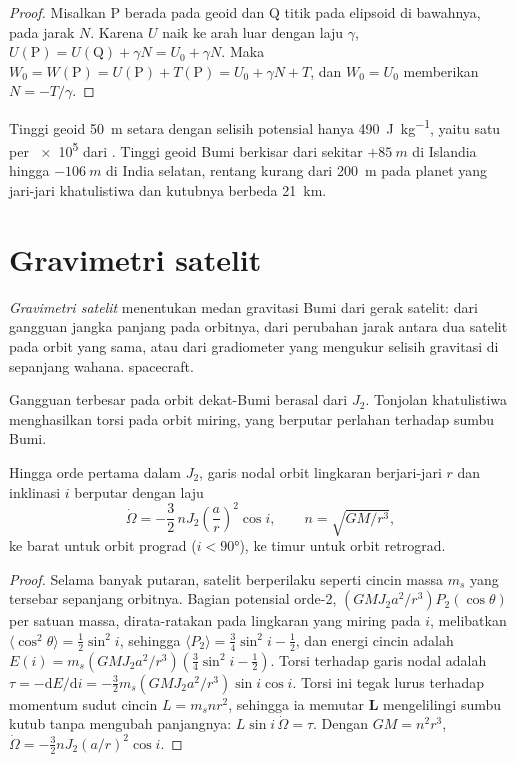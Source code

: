 \begin{proof}
Misalkan P berada pada geoid dan Q titik pada elipsoid di bawahnya, pada jarak
$N$. Karena $U$ naik ke arah luar dengan laju $\gamma$,
$U(\mathrm P) = U(\mathrm Q) + \gamma N = U_0 + \gamma N$. Maka
$W_0 = W(\mathrm P) = U(\mathrm P) + T(\mathrm P) = U_0 + \gamma N + T$, dan
$W_0 = U_0$ memberikan $N = -T/\gamma$.
\end{proof}

Tinggi geoid \qty{50}{m} setara dengan selisih potensial hanya
\qty{490}{J.kg^{-1}}, yaitu satu per \num{e5} dari . Tinggi
geoid Bumi berkisar dari sekitar $+\qty{85}{m}$ di Islandia hingga
$-\qty{106}{m}$ di India selatan,
rentang kurang dari \qty{200}{m} pada planet yang jari-jari khatulistiwa dan
kutubnya berbeda \qty{21}{km}.

\section{Gravimetri satelit}

\begin{definition}\label{def:b3:gravity-geodesy:satgrav}
\emph{Gravimetri satelit} menentukan medan gravitasi Bumi
dari gerak satelit: dari gangguan jangka panjang pada orbitnya, dari perubahan jarak
antara dua satelit pada orbit yang sama, atau dari gradiometer yang mengukur selisih
gravitasi di sepanjang wahana.
spacecraft.
\end{definition}

Gangguan terbesar pada orbit dekat-Bumi berasal dari $J_2$. Tonjolan
khatulistiwa menghasilkan torsi pada orbit miring, yang berputar perlahan
terhadap sumbu Bumi.

\begin{proposition}\label{prop:b3:gravity-geodesy:nodal}
Hingga orde pertama dalam $J_2$, garis nodal orbit lingkaran berjari-jari $r$ dan
inklinasi $i$ berputar dengan laju
\[
  \dot\Omega = -\frac32\,nJ_2\left(\frac ar\right)^2\cos i,\qquad n = \sqrt{GM/r^3} ,
\]
ke barat untuk orbit prograd ($i < \ang{90}$), ke timur untuk orbit retrograd.
\end{proposition}

\begin{proof}
Selama banyak putaran, satelit berperilaku seperti cincin massa $m_s$ yang tersebar sepanjang
orbitnya. Bagian potensial orde-2,
$(GMJ_2a^2/r^3)P_2(\cos\theta)$ per satuan massa, dirata-ratakan pada lingkaran yang
miring pada $i$, melibatkan $\langle\cos^2\theta\rangle = \tfrac12\sin^2i$, sehingga
$\langle P_2\rangle = \tfrac34\sin^2i - \tfrac12$, dan energi cincin adalah
$E(i) = m_s(GMJ_2a^2/r^3)(\tfrac34\sin^2i - \tfrac12)$. Torsi terhadap
garis nodal adalah $\tau = -\mathrm dE/\mathrm di = -\tfrac32m_s(GMJ_2a^2/r^3)\sin
i\cos i$. Torsi ini tegak lurus terhadap momentum sudut cincin $L = m_snr^2$, sehingga
ia memutar $\mathbf L$ mengelilingi sumbu kutub tanpa mengubah panjangnya:
$L\sin i\,\dot\Omega = \tau$. Dengan $GM = n^2r^3$, $\dot\Omega =
-\tfrac32nJ_2(a/r)^2\cos i$.
\end{proof}

